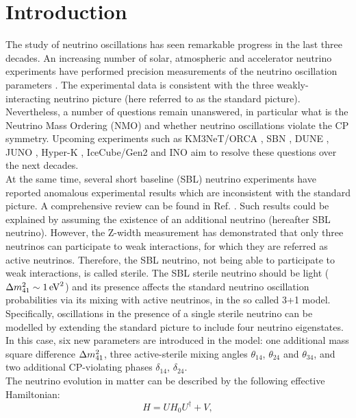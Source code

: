 \section{Introduction}
\label{sec:introduction}
The study of neutrino oscillations has seen remarkable progress in the last three decades. An increasing number of solar, atmospheric and accelerator neutrino experiments have performed precision measurements of the neutrino oscillation parameters \cite{PDG}. The experimental data is consistent with the three weakly-interacting neutrino picture (here referred to as the standard picture). Nevertheless, a number of questions remain unanswered, in particular what is the Neutrino Mass Ordering (NMO) and whether neutrino oscillations violate the CP symmetry. Upcoming experiments such as KM3NeT/ORCA \cite{loi}, SBN \cite{SBN}, DUNE \cite{DUNE}, JUNO \cite{JUNO}, Hyper-K \cite{Hyper-K}, IceCube/Gen2 \cite{ic_gentwo} and INO \cite{INO} aim to resolve these questions over the next decades. 
\\
At the same time, several short baseline (SBL) neutrino experiments have reported anomalous experimental results which are inconsistent with the standard picture. A comprehensive review can be found in Ref. \cite{sterile_review}. Such results could be explained by assuming the existence of an additional neutrino (hereafter SBL neutrino). However, the Z-width measurement \cite{Zwidth} has demonstrated that only three neutrinos can participate to weak interactions, for which they are referred as active neutrinos. Therefore, the SBL neutrino, not being able to participate to weak interactions, is called sterile. The SBL sterile neutrino should be light ($\Delta m^2_{41} \sim 1 \,\rm{eV}^2$) and its presence affects the standard neutrino oscillation probabilities via its mixing with active neutrinos, in the so called 3+1 model. 
\\
Specifically, oscillations in the presence of a single sterile neutrino can be modelled by extending the standard picture to include four neutrino eigenstates. In this case, six new parameters are introduced in the model: one additional mass square difference $\Delta m^2_{41}$, three active-sterile mixing angles $\theta_{14}$, $\theta_{24}$ and $\theta_{34}$, and two additional CP-violating phases $\delta_{14}$, $\delta_{24}$.
\\
The neutrino evolution in matter can be described by the following effective Hamiltonian:
\begin{equation}
\label{eq:Ham}
H = UH_0U^\dagger + V,
\end{equation}
